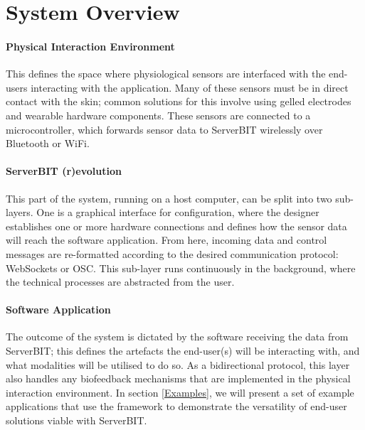 \section{System Overview}

\paragraph{Physical Interaction Environment}
This defines the space where physiological sensors are interfaced with the end-users interacting with the application. Many of these sensors must be in direct contact with the skin; common solutions for this involve using gelled electrodes and wearable hardware components. These sensors are connected to a microcontroller, which forwards sensor data to ServerBIT wirelessly over Bluetooth or WiFi.

\paragraph{ServerBIT (r)evolution}
This part of the system, running on a host computer, can be split into two sub-layers. One is a graphical interface for configuration, where the designer establishes one or more hardware connections and defines how the sensor data will reach the software application. From here, incoming data and control messages are re-formatted according to the desired communication protocol: WebSockets or OSC. This sub-layer runs continuously in the background, where the technical processes are abstracted from the user.

\paragraph{Software Application}
The outcome of the system is dictated by the software receiving the data from ServerBIT; this defines the artefacts the end-user(s) will be interacting with, and what modalities will be utilised to do so.
As a bidirectional protocol, this layer also handles any biofeedback mechanisms that are implemented in the physical interaction environment.
In section \ref{Examples}, we will present a set of example applications that use the framework to demonstrate the versatility of end-user solutions viable with ServerBIT.

